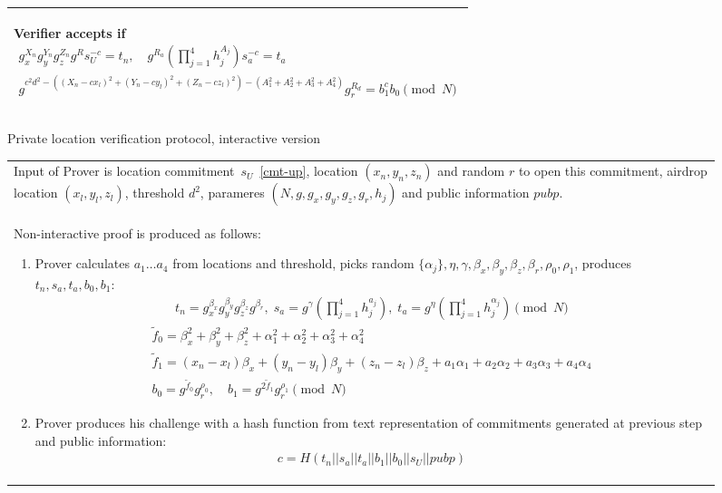 \documentclass{article}
\begin{document}
\begin{figure}[!htb]
\begin{tabular}{|p{\linewidth}|}
\begin{enumerate}
  Verifier accepts if
\begin{gather}
\label{verf-linear}
  g_x^{X_n} g_y^{Y_n} g_z^{Z_n} g^{R} s_U^{-c} = t_n, \quad
  g^{R_a} (\prod_{j=1}^4 h_j^{A_j}) s_a^{-c} = t_a \\
\label{verf-distn}
  g^{c^2 d^2 - ((X_n - c x_l)^2 + (Y_n - c y_l)^2 + (Z_n - c z_l)^2) - (A_1^2 + A_2^2 + A_3^2 + A_4^2)} g_r^{R_d} = b_1^{c} b_0  \pmod{N}
\end{gather}
\end{enumerate}
\\
\hline
\end{tabular}
\caption{Private location verification protocol, interactive version}
\label{ip_fig}
\end{figure}

\begin{figure}[!htb]
\begin{tabular}{|p{\linewidth}|}
\hline

Input of Prover is
  location commitment~$s_U$~\eqref{cmt-up},
  location $(x_n, y_n, z_n)$ and random $r$ to open this commitment,
  airdrop location $(x_l, y_l, z_l)$,
  threshold $d^2$,
  parameres $(N, g, g_x, g_y, g_z, g_r, h_j)$
  and public information $pubp$.
\\
Non-interactive proof is produced as follows:
\begin{enumerate}
\item
  Prover calculates $a_1 \dots a_4$ from locations and threshold,
  picks random $\{\alpha_j\}, \eta, \gamma, \beta_x, \beta_y, \beta_z, \beta_r, \rho_0, \rho_1$,
  produces $t_n, s_a, t_a, b_0, b_1$:
\begin{gather}
  t_n = g_x^{\beta_x} g_y^{\beta_y} g_z^{\beta_z} g^{\beta_r}, \;
  s_a = g^{\gamma} (\prod_{j=1}^4 h_j^{a_j}),  \;
  t_a = g^{\eta} (\prod_{j=1}^4 h_j^{\alpha_j}) \pmod{N}
\end{gather}
\begin{gather}
  \tilde f_0 = \beta_x^2 + \beta_y^2 +\beta_z^2 + \alpha_1^2 + \alpha_2^2 + \alpha_3^2 + \alpha_4^2  \\
  \tilde f_1 = (x_n - x_l) \beta_x  + (y_n - y_l) \beta_y  + (z_n - z_l) \beta_z + a_1 \alpha_1 + a_2 \alpha_2 + a_3 \alpha_3 + a_4 \alpha_4 \\
  b_0 = g^{\tilde f_0} g_r^{\rho_0},   \quad
  b_1 = g^{2 \tilde f_1} g_r^{\rho_1} \pmod{N}
\end{gather}

\item
  Prover produces his challenge with a hash function
  from text representation of commitments generated at previous step and public information:
\begin{gather}
  c = H(t_n || s_a || t_a || b_1 || b_0 || s_U || pubp)
\end{gather}


\end{enumerate}
\end{tabular}
\end{figure}
\end{document}
